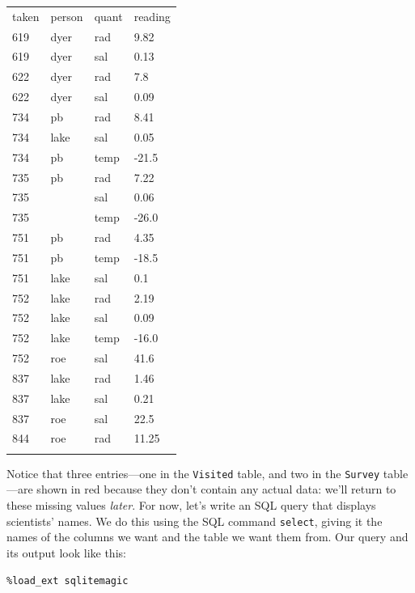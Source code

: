 \documentclass[]{book}
\newcommand{\gdef}[2]{\emph{#2}}
\begin{document}
\begin{longtable}[c]{@{}llll@{}}
\hline\noalign{\medskip}
taken & person & quant & reading
\\\noalign{\medskip}
\hline\noalign{\medskip}
619 & dyer & rad & 9.82
\\\noalign{\medskip}
619 & dyer & sal & 0.13
\\\noalign{\medskip}
622 & dyer & rad & 7.8
\\\noalign{\medskip}
622 & dyer & sal & 0.09
\\\noalign{\medskip}
734 & pb & rad & 8.41
\\\noalign{\medskip}
734 & lake & sal & 0.05
\\\noalign{\medskip}
734 & pb & temp & -21.5
\\\noalign{\medskip}
735 & pb & rad & 7.22
\\\noalign{\medskip}
735 & ~ & sal & 0.06
\\\noalign{\medskip}
735 & ~ & temp & -26.0
\\\noalign{\medskip}
751 & pb & rad & 4.35
\\\noalign{\medskip}
751 & pb & temp & -18.5
\\\noalign{\medskip}
751 & lake & sal & 0.1
\\\noalign{\medskip}
752 & lake & rad & 2.19
\\\noalign{\medskip}
752 & lake & sal & 0.09
\\\noalign{\medskip}
752 & lake & temp & -16.0
\\\noalign{\medskip}
752 & roe & sal & 41.6
\\\noalign{\medskip}
837 & lake & rad & 1.46
\\\noalign{\medskip}
837 & lake & sal & 0.21
\\\noalign{\medskip}
837 & roe & sal & 22.5
\\\noalign{\medskip}
844 & roe & rad & 11.25
\\\noalign{\medskip}
\hline
\end{longtable}

Notice that three entries---one in the \texttt{Visited} table, and two
in the \texttt{Survey} table---are shown in red because they don't
contain any actual data: we'll return to these missing values
\gdef{s:null}{later}. For now, let's write an SQL query that
displays scientists' names. We do this using the SQL command
\texttt{select}, giving it the names of the columns we want and the
table we want them from. Our query and its output look like this:

\begin{verbatim}
%load_ext sqlitemagic
\end{verbatim}
\end{document}
